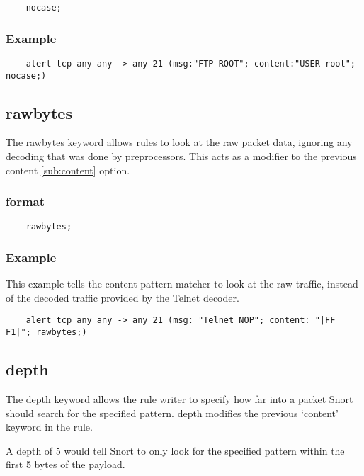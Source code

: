 \documentclass[english]{report}
\begin{document}
\begin{verbatim}
    nocase;
\end{verbatim}

\subsubsection{Example}

\begin{verbatim}
    alert tcp any any -> any 21 (msg:"FTP ROOT"; content:"USER root"; nocase;)
\end{verbatim}

\subsection{rawbytes}
\label{sub:rawbytes}

The rawbytes keyword allows rules to look at the raw packet data, ignoring any
decoding that was done by preprocessors.  This acts as a modifier to the
previous content \ref{sub:content} option. 

\subsubsection{format}

\begin{verbatim}
    rawbytes;
\end{verbatim}

\subsubsection{Example}

This example tells the content pattern matcher to look at the raw traffic,
instead of the decoded traffic provided by the Telnet decoder.

\begin{verbatim}
    alert tcp any any -> any 21 (msg: "Telnet NOP"; content: "|FF F1|"; rawbytes;)
\end{verbatim}

\subsection{depth}
\label{sub:depth}

The depth keyword allows the rule writer to specify how far into a packet Snort
should search for the specified pattern.  depth modifies the previous `content'
keyword in the rule.

A depth of 5 would tell Snort to only look for the specified pattern within the
first 5 bytes of the payload.
\end{document}
